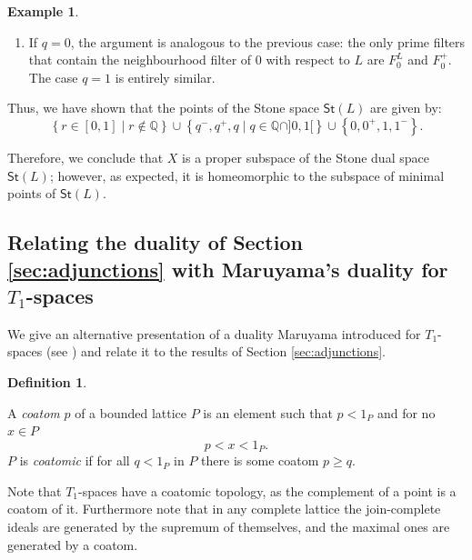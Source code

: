 \documentclass{article}
\theoremstyle{plain}
\theoremstyle{definition}
\newtheorem{definition}[theorem]{Definition}
\newtheorem{example}[theorem]{Example}
\theoremstyle{remark}
\newcommand{\bool}[1]{\mathsf{#1}}
\newcommand{\bp}[1]{\left\lbrace #1 \right\rbrace}
\newcommand{\0}{\mathbbm 0}
\newcommand{\1}{\mathbbm 1}
\newcommand{\2}{\mathbbm 2}
\begin{document}
\begin{example}
\begin{itemize}
\begin{enumerate}
    \item If \(q = 0\), the argument is analogous to the previous case: the only prime filters that contain the neighbourhood filter of \(0\) with respect to \(L\) are \(F^L_0\) and \(F^+_0\). The case \(q = 1\) is entirely similar.
\end{enumerate}

Thus, we have shown that the points of the Stone space \(\bool{St}(L)\) are given by:
\[
\left\{ r \in [0,1] \mid r \notin \mathbb{Q} \right\} \cup \left\{ q^-, q^+, q \mid q \in \mathbb{Q} \cap ]0,1[ \right\} \cup \left\{ 0, 0^+, 1, 1^- \right\}.
\]

Therefore, we conclude that \(X\) is a proper subspace of the Stone dual space \(\bool{St}(L)\); however, as expected, it is homeomorphic to the subspace of minimal points of \(\bool{St}(L)\).

\end{itemize}
\end{example}
\subsection{Relating the duality of Section \ref{sec:adjunctions} with Maruyama's duality for $T_1$-spaces}

We give an alternative presentation of a duality Maruyama introduced for $T_1$-spaces (see \cite{maruyama}) and relate it to the results of Section \ref{sec:adjunctions}.
\begin{definition}\label{def:framecomplprimejoincomplete}


A \emph{coatom} $p$ of a bounded lattice $P$ is an element  such that \(p < 1_P\) and for no $x\in P$
\[ p < x < 1_P. \]
$P$ is \emph{coatomic} if for all $q< 1_P$ in $P$ there is some coatom $p\geq q$.
\end{definition}

Note that $T_1$-spaces have a coatomic topology, as the complement of a point is a coatom of it. Furthermore note that in any complete lattice the join-complete ideals are generated by the supremum of themselves, and the maximal ones are generated by a coatom.
\end{document}
